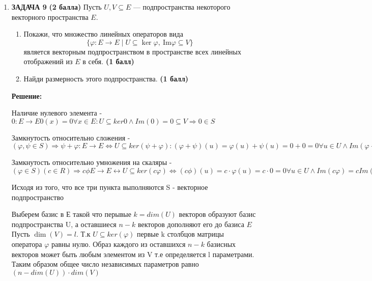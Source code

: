 \documentclass[a4paper,12pt]{article}
\begin{document}
\begin{enumerate}
    \[
    aD^2+D = A
    \]
    т.к сумма двух верхнетреугольных матриц является верхнетреугольной, то А - верхнетреугольная. А значит имеет решения.
    

    \item \textbf{ЗАДАЧА 9} \textbf{(2 балла)} Пусть $U, V \subseteq E$ — подпространства некоторого векторного пространства $E$.
    \begin{enumerate}
        \item Покажи, что множество линейных операторов вида
        \[
        \{ \varphi: E \to E \mid U \subseteq \ker \varphi, \ \text{Im} \varphi \subseteq V \}
        \]
        является векторным подпространством в пространстве всех линейных отображений из $E$ в себя. \textbf{(1 балл)}
        \item Найди размерность этого подпространства. \textbf{(1 балл)}
    \end{enumerate}

    \textbf{Решение: }
    
    Наличие нулевого элемента - $0: E \to E 0(x)=0 \forall x \in E: U \subseteq ker0 \land Im(0) = {0}\subseteq V \Rightarrow 0 \in S$
    
    Замкнутость относительно сложения - $(\varphi, \psi \in S) \Rightarrow \psi + \varphi: E \to E \Longleftrightarrow U \subseteq ker(\psi + \varphi): (\varphi + \psi)(u) = \varphi(u)+\psi(u) = 0 + 0 = 0 \forall u \in U \land Im(\varphi + \psi) \subseteq Im(\varphi) + Im(\psi) \subseteq V + V = V \Rightarrow \varphi + \psi \in S$

    Замкнутость относительно умножения на скаляры - $(\varphi \in S)(c \in R) \Rightarrow c\phi E \to E \longleftrightarrow U \subseteq ker(c\varphi) \Leftrightarrow (c\phi)(u) = c \cdot \varphi(u) = c \cdot 0 = 0 \forall u \in U \land Im(c\varphi) = c Im(\varphi) \subseteq V \Leftrightarrow c \cdot V \subseteq V \Rightarrow c\varphi \in S$

    Исходя из того, что все три пункта выполняются S - векторное подпространство

    Выберем базис в Е такой что перывые $k=dim(U)$ векторов образуют базис подпространства U, а оставшиеся $n-k$ векторов дополняют его до базиса $E$ Пусть $\dim(V)=l$. Т.к $U \subseteq ker(\varphi)$ первые k столбцов матрицы оператора $\varphi$ равны нулю. Образ каждого из оставшихся $n-k$ базисных векторов может быть любым элементом из V т.е определяется l параметрами. Таким образом общее число независимых параметров равно $(n-dim(U))\cdot dim(V)$




\end{enumerate}
\end{document}
